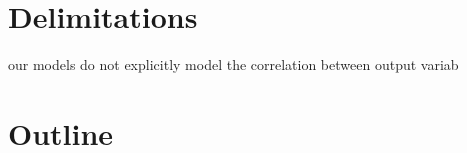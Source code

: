 \section{Delimitations}

our models do not explicitly model the correlation between output variab

\section{Outline}
